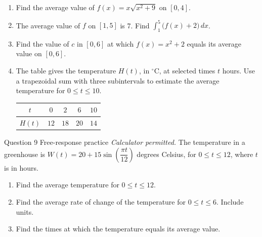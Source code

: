 \documentclass[11pt]{article}
\begin{document}
\begin{enumerate}[leftmargin=*,itemsep=2pt,start=5]
  \item Find the average value of $f(x)=x\sqrt{x^2+9}$ on $[0,4]$.\work{2.8cm}
  \item The average value of $f$ on $[1,5]$ is 7. Find $\displaystyle\int_{1}^{5}\big(f(x)+2\big)\,dx$.\work{2.8cm}
  \item Find the value of $c$ in $[0,6]$ at which $f(x)=x^2+2$ equals its average value on $[0,6]$.\work{2.8cm}
  \item The table gives the temperature $H(t)$, in $^\circ$C, at selected times $t$ hours. Use a trapezoidal sum with three subintervals to estimate the average temperature for $0\le t\le10$.\begin{center}\renewcommand{\arraystretch}{1.25}\begin{tabular}{|c|c|c|c|c|}\hline $t$ & $0$ & $2$ & $6$ & $10$ \\ \hline $H(t)$ & $12$ & $18$ & $20$ & $14$ \\ \hline\end{tabular}\end{center}\work{2.8cm}
\end{enumerate}

\begin{frbox}{Question 9 \textperiodcentered{} Free-response practice}
\emph{Calculator permitted.} The temperature in a greenhouse is $W(t)=20+15\sin\!\left(\dfrac{\pi t}{12}\right)$ degrees Celsius, for $0\le t\le12$, where $t$ is in hours.
\begin{enumerate}[label=(\alph*),leftmargin=*,itemsep=2pt]
  \item Find the average temperature for $0\le t\le12$.\work{2.6cm}
  \item Find the average rate of change of the temperature for $0\le t\le6$. Include units.\work{2.6cm}
  \item Find the times at which the temperature equals its average value.\work{2.6cm}
\end{enumerate}
\end{frbox}
\end{document}
